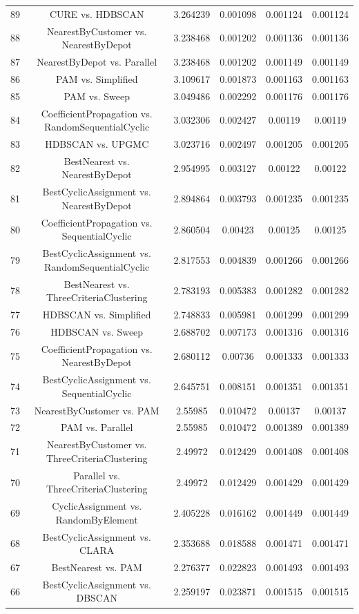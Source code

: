 \documentclass[a4paper,10pt]{article}
\begin{document}
\begin{landscape}
\begin{table}[!htp]
\begin{tabular}{cccccc}
89&CURE vs. HDBSCAN&3.264239&0.001098&0.001124&0.001124\\
88&NearestByCustomer vs. NearestByDepot&3.238468&0.001202&0.001136&0.001136\\
87&NearestByDepot vs. Parallel&3.238468&0.001202&0.001149&0.001149\\
86&PAM vs. Simplified&3.109617&0.001873&0.001163&0.001163\\
85&PAM vs. Sweep&3.049486&0.002292&0.001176&0.001176\\
84&CoefficientPropagation vs. RandomSequentialCyclic&3.032306&0.002427&0.00119&0.00119\\
83&HDBSCAN vs. UPGMC&3.023716&0.002497&0.001205&0.001205\\
82&BestNearest vs. NearestByDepot&2.954995&0.003127&0.00122&0.00122\\
81&BestCyclicAssignment vs. NearestByDepot&2.894864&0.003793&0.001235&0.001235\\
80&CoefficientPropagation vs. SequentialCyclic&2.860504&0.00423&0.00125&0.00125\\
79&BestCyclicAssignment vs. RandomSequentialCyclic&2.817553&0.004839&0.001266&0.001266\\
78&BestNearest vs. ThreeCriteriaClustering&2.783193&0.005383&0.001282&0.001282\\
77&HDBSCAN vs. Simplified&2.748833&0.005981&0.001299&0.001299\\
76&HDBSCAN vs. Sweep&2.688702&0.007173&0.001316&0.001316\\
75&CoefficientPropagation vs. NearestByDepot&2.680112&0.00736&0.001333&0.001333\\
74&BestCyclicAssignment vs. SequentialCyclic&2.645751&0.008151&0.001351&0.001351\\
73&NearestByCustomer vs. PAM&2.55985&0.010472&0.00137&0.00137\\
72&PAM vs. Parallel&2.55985&0.010472&0.001389&0.001389\\
71&NearestByCustomer vs. ThreeCriteriaClustering&2.49972&0.012429&0.001408&0.001408\\
70&Parallel vs. ThreeCriteriaClustering&2.49972&0.012429&0.001429&0.001429\\
69&CyclicAssignment vs. RandomByElement&2.405228&0.016162&0.001449&0.001449\\
68&BestCyclicAssignment vs. CLARA&2.353688&0.018588&0.001471&0.001471\\
67&BestNearest vs. PAM&2.276377&0.022823&0.001493&0.001493\\
66&BestCyclicAssignment vs. DBSCAN&2.259197&0.023871&0.001515&0.001515\\

\end{tabular}
\end{table}
\end{landscape}
\end{document}

